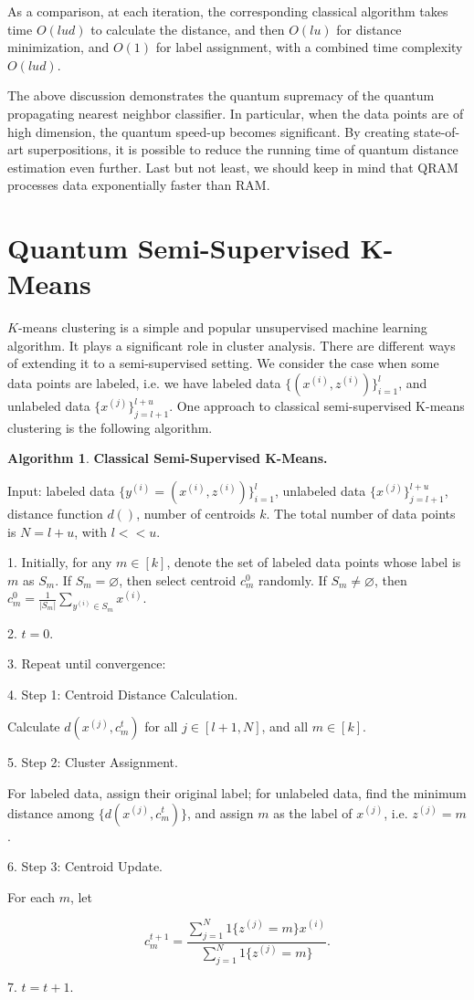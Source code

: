 \documentclass[11pt]{article}
\theoremstyle{definition}
\newtheorem{algorithm}{Algorithm}[section]
\def\zsi{z^{(i)}}
\def\zsj{z^{(j)}}
\def\xsi{x^{(i)}}
\def\xsj{x^{(j)}}
\def\ysi{y^{(i)}}
\begin{document}
As a comparison, at each iteration, the corresponding classical algorithm takes time $O(l u d)$ to calculate the distance, and then $O (l u)$ for distance minimization, and $O(1)$ for label assignment, with a combined time complexity $O( l u d)$. 

The above discussion demonstrates the quantum supremacy of the quantum propagating nearest neighbor classifier. In particular, when the data points are of high dimension, the quantum speed-up becomes significant. By creating state-of-art superpositions, it is possible to reduce the running time of quantum distance estimation even further. Last but not least, we should keep in mind that QRAM processes data exponentially faster than RAM.


\section{Quantum Semi-Supervised K-Means}
\label{kmeans}

$K$-means clustering is a simple and popular unsupervised machine learning algorithm. It plays a significant role in cluster analysis. There are different ways of extending it to a semi-supervised setting. We consider the case when some data points are labeled, i.e. we have labeled data $\{ (\xsi, \zsi) \}_{i = 1}^l$, and unlabeled data $\{ \xsj \}_{j = l+1}^{l + u}$. One approach to classical semi-supervised K-means clustering is the following algorithm.

\begin{algorithm}
\textbf{Classical Semi-Supervised K-Means.}

Input: labeled data $\{ \ysi = (\xsi, \zsi) \}_{i = 1}^l$, unlabeled data $\{ \xsj \}_{j = l+1}^{l + u}$, distance function $d()$, number of centroids $k$. The total number of data points is $N = l + u$, with $l << u$.

1. Initially, for any $m \in [k]$, denote the set of labeled data points whose label is $m$ as $S_m$. If $S_m = \varnothing$, then select centroid $c_m^0$ randomly. If $S_m \neq \varnothing$, then $c_m^0 = \frac{1}{|S_m|}\sum_{\ysi \in S_m} \xsi$.

2. $t = 0.$

3. Repeat until convergence:

4. Step 1: Centroid Distance Calculation.

Calculate $d(\xsj, c_m^t)$ for all $j \in [l+1, N]$, and all $m \in [k]$.

5. Step 2: Cluster Assignment.

For labeled data, assign their original label; for unlabeled data, find the minimum distance among $\{d(\xsj, c_m^t) \}$, and assign $m$ as the label of $\xsj$, i.e. $\zsj = m$.

6. Step 3: Centroid Update.

For each $m$, let 

\begin{equation}
    c_m^{t+1} = \frac{\sum_{j=1}^{N} 1\{\zsj = m\} \xsi}{\sum_{j=1}^{N} 1\{\zsj = m\}}.
\end{equation}

7. $t=t+1$.


\end{algorithm}
\end{document}
